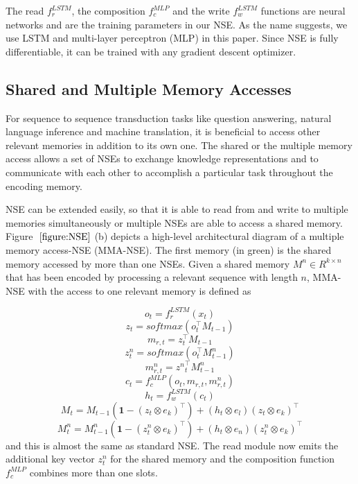 \documentclass{article}
\begin{document}
The read $f^{LSTM}_r$, the composition $f^{MLP}_c$ and the write $f^{LSTM}_w$ functions are neural networks and are the training parameters in our NSE. As the name suggests, we use LSTM and multi-layer perceptron (MLP) in this paper. Since NSE is fully differentiable, it can be trained with any gradient descent optimizer.  

\subsection{Shared and Multiple Memory Accesses}

For sequence to sequence transduction tasks like question answering, natural language inference and machine translation, it is beneficial to access other relevant memories in addition to its own one. The shared or the multiple memory access allows a set of NSEs to exchange knowledge representations and to communicate with each other to accomplish a particular task throughout the encoding memory. 

NSE can be extended easily, so that it is able to read from and write to multiple memories simultaneously or multiple NSEs are able to access a shared memory. Figure $~\ref{figure:NSE}$ (b) depicts a high-level architectural diagram of a multiple memory access-NSE (MMA-NSE). The first memory (in green) is the shared memory accessed by more than one NSEs. Given a shared memory $M^{n} \in R^{k \times n}$ that has been encoded by processing a relevant sequence with length $n$, MMA-NSE with the access to one relevant memory is defined as

\begin{equation}
o_t = f^{LSTM}_r(x_t)
\end{equation}
\begin{equation}
z_t = softmax(o_t^{\top} M_{t-1})
\end{equation}
\begin{equation}
m_{r,t} = z_t^{\top} M_{t-1}
\end{equation}
\begin{equation}
z^n_t = softmax(o_t^{\top} M^n_{t-1})
\end{equation}
\begin{equation}
m^n_{r,t} = {z^n}_t^{\top} M^n_{t-1}
\end{equation}
\begin{equation}
c_t = f^{MLP}_c(o_t, m_{r,t}, m^n_{r,t})
\end{equation}
\begin{equation}
h_t = f^{LSTM}_w(c_t)
\end{equation}
\begin{equation}
M_t = M_{t-1}(\textbf{1}-(z_t \otimes e_k)^{\top}) + (h_t \otimes e_l) (z_t \otimes e_k)^{\top}
\end{equation}
\begin{equation}
M^n_t = M^n_{t-1}(\textbf{1}-(z^n_t \otimes e_k)^{\top}) + (h_t \otimes e_n) (z^n_t \otimes e_k)^{\top}
\end{equation}
and this is almost the same as standard NSE. The read module now emits the additional key vector $z^n_t$ for the shared memory and the composition function $f^{MLP}_c$ combines more than one slots.
\end{document}
